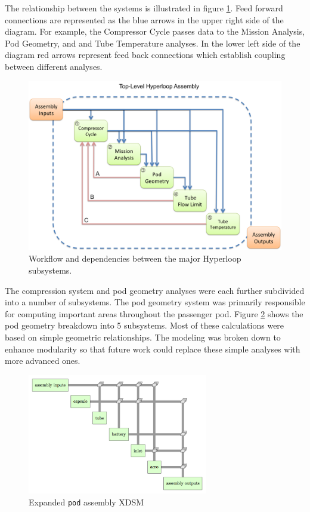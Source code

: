 \documentclass[heading.tex]{subfiles}
\begin{document}
The relationship between the systems is illustrated in figure \ref{f:hyperloopXDSM}. Feed forward connections 
are represented as the blue arrows in the upper right side of the diagram. For example, the Compressor Cycle 
passes data to the Mission Analysis, Pod Geometry, and and Tube Temperature analyses. In the lower left 
side of the diagram red arrows represent feed back connections which establish coupling between different 
analyses. 

\begin{figure}[hbtp]
\centering
\includegraphics[width=\textwidth]{images/TopAssembly.png}
\caption{Workflow and dependencies between the major Hyperloop subsystems.}
\label{f:hyperloopXDSM}
\end{figure}

The compression system and pod geometry analyses were each further subdivided into a number of subsystems. The pod geometry 
system was primarily responsible for computing important areas throughout the passenger pod. Figure \ref{f:podXDSM} shows the 
pod geometry breakdown into 5 subsystems. Most of these calculations were based on simple geometric relationships. The 
modeling was broken down to enhance modularity so that future work could replace these simple analyses with more advanced ones. 

\begin{figure}[hbtp]
\centering
\includegraphics[width=0.7\textwidth]{images/pod_assembly_xdsm.png}
\caption{Expanded \texttt{pod} assembly XDSM}
\label{f:podXDSM}
\end{figure}
\end{document}
